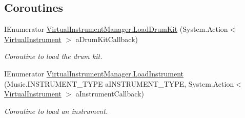 \subsection*{Coroutines}
\begin{DoxyCompactItemize}
\item 
I\+Enumerator \hyperlink{group___virtual_instrument_manager_event_types_gaba165ca4757b6c8555914fe6b42b638d}{Virtual\+Instrument\+Manager.\+Load\+Drum\+Kit} (System.\+Action$<$ \hyperlink{class_virtual_instrument}{Virtual\+Instrument} $>$ a\+Drum\+Kit\+Callback)
\begin{DoxyCompactList}\small\item\em Coroutine to load the drum kit. \end{DoxyCompactList}\item 
I\+Enumerator \hyperlink{group___virtual_instrument_manager_event_types_gab8082c1cc590771bf57da8b5ae8603d1}{Virtual\+Instrument\+Manager.\+Load\+Instrument} (Music.\+I\+N\+S\+T\+R\+U\+M\+E\+N\+T\+\_\+\+T\+Y\+PE a\+I\+N\+S\+T\+R\+U\+M\+E\+N\+T\+\_\+\+T\+Y\+PE, System.\+Action$<$ \hyperlink{class_virtual_instrument}{Virtual\+Instrument} $>$ a\+Instrument\+Callback)
\begin{DoxyCompactList}\small\item\em Coroutine to load an instrument. \end{DoxyCompactList}\end{DoxyCompactItemize}
